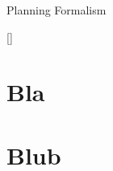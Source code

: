 \begin{frame}{Planning Formalism}

[\cite{backstrom:nebel:ci-95,helmert:ai-09}]

\end{frame}



%

\section[Bla]{Bla}
\subsection*{}

\begin{frame}{}

\end{frame}



%

\section[Blub]{Blub}
\subsection*{}

\begin{frame}{}

\end{frame}




\section*{}

